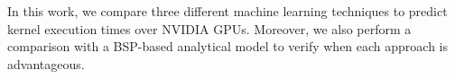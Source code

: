 In this work, we compare three different machine learning techniques to predict kernel execution times over NVIDIA GPUs. Moreover, we also perform a comparison with a BSP-based analytical model to verify when each approach is advantageous.




